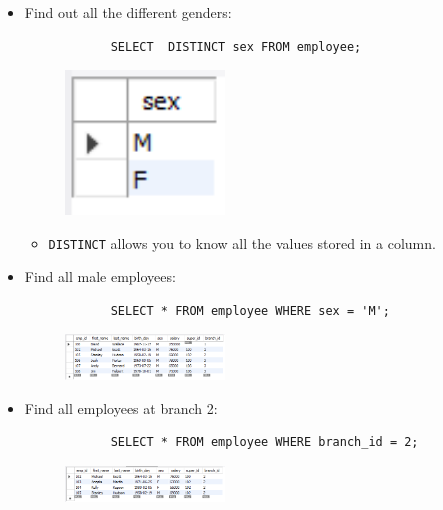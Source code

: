 \begin{itemize}
    \item Find out all the different genders:
        \begin{verbatim}
            SELECT  DISTINCT sex FROM employee;
        \end{verbatim}
        \begin{figure}[H]
            \centering
            \includegraphics[width=0.4\textwidth]{./Figs/2020-12-24-20-46-37.png}
        \end{figure}
        \begin{itemize}
            \item \texttt{DISTINCT} allows you to know all the values stored in a column. 
        \end{itemize}
    
    \item Find all male employees:
        \begin{verbatim}
            SELECT * FROM employee WHERE sex = 'M';
        \end{verbatim}
        \begin{figure}[H]
            \centering
            \includegraphics[width=0.4\textwidth]{./Figs/2020-12-24-20-47-19.png}
        \end{figure}
    
    \item Find all employees at branch 2:
        \begin{verbatim}
            SELECT * FROM employee WHERE branch_id = 2;
        \end{verbatim}
        \begin{figure}[H]
            \centering
            \includegraphics[width=0.4\textwidth]{./Figs/2020-12-24-20-48-13.png}
        \end{figure}
    

\end{itemize}
